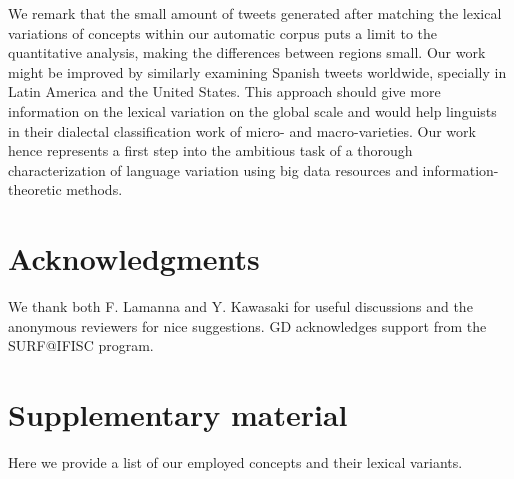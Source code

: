 \documentclass[11pt]{article}
\begin{document}
We remark that the small amount of tweets generated after matching the lexical variations of concepts within our automatic corpus puts a limit to the quantitative analysis, making the differences between regions small. Our work might be improved by similarly examining Spanish tweets worldwide, specially in Latin America and the United States. This approach should give more information on the lexical variation on the global scale and would help linguists in their dialectal classification work of micro- and macro-varieties. Our work hence represents a first step into the ambitious task of a thorough characterization of language variation using big data resources and information-theoretic methods.

\section*{Acknowledgments}

We thank both F. Lamanna and Y. Kawasaki for useful discussions
and the anonymous reviewers for nice suggestions.
GD acknowledges support from the SURF@IFISC program.




\section*{Supplementary material}

Here we provide a list of our employed concepts and their lexical variants.
\end{document}
